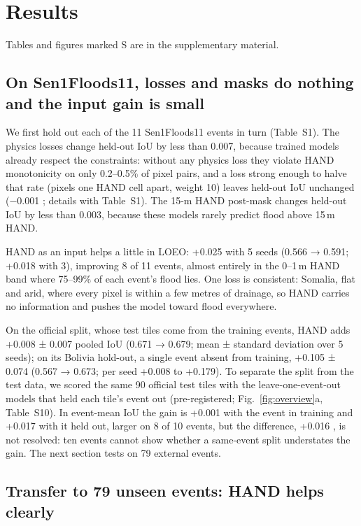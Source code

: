 \section{Results}
\label{sec:results}

Tables and figures marked S are in the supplementary material.


\subsection{On Sen1Floods11, losses and masks do nothing and the input gain is small}
\label{sec:loeo}

We first hold out each of the 11 Sen1Floods11 events in turn (Table~S1). The physics losses change
held-out IoU by less than 0.007, because trained models already respect the constraints: without any
physics loss they violate HAND monotonicity on only 0.2--0.5\% of pixel pairs, and a loss strong enough
to halve that rate (pixels one HAND cell apart, weight 10) leaves held-out IoU unchanged (−0.001
; details with Table~S1). The 15-m HAND post-mask changes held-out IoU by less than 0.003,
because these models rarely predict flood above 15\,m HAND.

HAND as an input helps a little in LOEO: +0.025  with 5 seeds (0.566 → 0.591; +0.018
with 3), improving 8 of 11 events, almost entirely in the 0--1\,m HAND band where 75--99\% of each event's
flood lies. One loss is consistent: Somalia, flat and arid, where every pixel is within a few metres of
drainage, so HAND carries no information and pushes the model toward flood everywhere.

On the official split, whose test tiles come from the training events, HAND adds +0.008 ± 0.007 pooled
IoU (0.671 → 0.679; mean ± standard deviation over 5 seeds); on its Bolivia hold-out, a single event absent
from training, +0.105 ± 0.074 (0.567 → 0.673; per seed +0.008 to +0.179). To separate the split from the
test data, we scored the same 90 official test tiles with the leave-one-event-out models that held each
tile's event out (pre-registered; Fig.~\ref{fig:overview}a, Table~S10). In event-mean IoU the gain is
+0.001 with the event in training and +0.017 with it held out, larger on 8 of 10 events, but the
difference, +0.016 , is not resolved: ten events cannot show whether a same-event split
understates the gain. The next section tests on 79 external events.

\subsection{Transfer to 79 unseen events: HAND helps clearly}
\label{sec:transfer}

